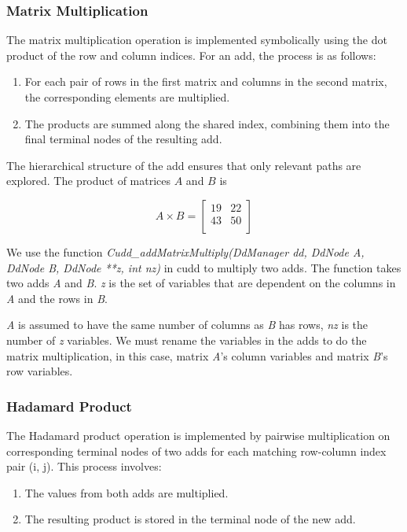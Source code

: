 \subsubsection{Matrix Multiplication}
The matrix multiplication operation is implemented symbolically using the dot product of the row and column indices.
For an \gls{add}, the process is as follows:

\begin{enumerate}
    \item For each pair of rows in the first matrix and columns in the second matrix, the corresponding elements are multiplied.
    \item The products are summed along the shared index, combining them into the final terminal nodes of the resulting \gls{add}.
\end{enumerate}

The hierarchical structure of the \gls{add} ensures that only relevant paths are explored.
The product of matrices $A$ and $B$ is

\[
    A \times B = \begin{bmatrix}
                     19 & 22 \\
                     43 & 50 \\
    \end{bmatrix}
\]

We use the function \textit{Cudd\_addMatrixMultiply(DdManager dd, DdNode A, DdNode B, DdNode **z, int nz)} in \gls{cudd} to multiply two \glspl{add}.
The function takes two \glspl{add} \textit{A} and \textit{B}.
\textit{z} is the set of variables that are dependent on the columns in \textit{A} and the rows in \textit{B}.

\textit{A} is assumed to have the same number of columns as \textit{B} has rows, \textit{nz} is the number of \textit{z} variables.
We must rename the variables in the \glspl{add} to do the matrix multiplication, in this case, matrix \textit{A}'s column variables and matrix \textit{B}'s row variables.

\subsubsection{Hadamard Product}\label{subsubsec:hadamard-product}
The Hadamard product operation is implemented by pairwise multiplication on corresponding terminal nodes of two \glspl{add} for each matching row-column index pair (i, j).
This process involves:

\begin{enumerate}
    \item The values from both \glspl{add} are multiplied.
    \item The resulting product is stored in the terminal node of the new \gls{add}.
\end{enumerate}

